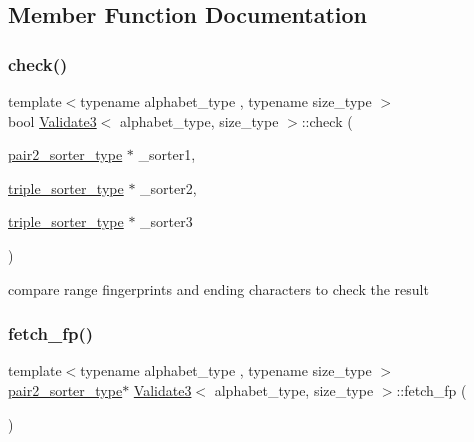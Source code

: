 \subsection{Member Function Documentation}
\mbox{\label{class_validate3_ade475094c421af71da65620b706dec3f}} 
\subsubsection{\texorpdfstring{check()}{check()}}
{\footnotesize\ttfamily template$<$typename alphabet\+\_\+type , typename size\+\_\+type $>$ \\
bool \hyperlink{class_validate3}{Validate3}$<$ alphabet\+\_\+type, size\+\_\+type $>$\+::check (\begin{DoxyParamCaption}\item[{\hyperlink{class_validate3_a3a7778ec3337ed3baf9a7515cf0a94ad}{pair2\+\_\+sorter\+\_\+type} $\ast$}]{\+\_\+sorter1,  }\item[{\hyperlink{class_validate3_ab3d4fd99ae8b2967f0b64b71a28efc66}{triple\+\_\+sorter\+\_\+type} $\ast$}]{\+\_\+sorter2,  }\item[{\hyperlink{class_validate3_ab3d4fd99ae8b2967f0b64b71a28efc66}{triple\+\_\+sorter\+\_\+type} $\ast$}]{\+\_\+sorter3 }\end{DoxyParamCaption})\hspace{0.3cm}{\ttfamily [inline]}}



compare range fingerprints and ending characters to check the result 

\mbox{\label{class_validate3_ad41c23715467e5201ef2705d38d8f81d}} 
\subsubsection{\texorpdfstring{fetch\+\_\+fp()}{fetch\_fp()}}
{\footnotesize\ttfamily template$<$typename alphabet\+\_\+type , typename size\+\_\+type $>$ \\
\hyperlink{class_validate3_a3a7778ec3337ed3baf9a7515cf0a94ad}{pair2\+\_\+sorter\+\_\+type}$\ast$ \hyperlink{class_validate3}{Validate3}$<$ alphabet\+\_\+type, size\+\_\+type $>$\+::fetch\+\_\+fp (\begin{DoxyParamCaption}{ }\end{DoxyParamCaption})\hspace{0.3cm}{\ttfamily [inline]}}



